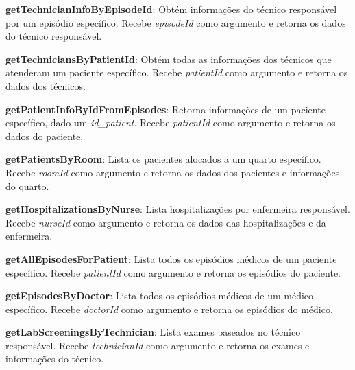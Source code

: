 \vspace{0.15cm}

\textbf{getTechnicianInfoByEpisodeId}: Obtém informações do técnico responsável por um episódio específico. Recebe \textit{episodeId} como argumento e retorna os dados do técnico responsável.

\vspace{0.15cm}

\textbf{getTechniciansByPatientId}: Obtém todas as informações dos técnicos que atenderam um paciente específico. Recebe \textit{patientId} como argumento e retorna os dados dos técnicos.

\vspace{0.15cm}

\textbf{getPatientInfoByIdFromEpisodes}: Retorna informações de um paciente específico, dado um \textit{id\_patient}. Recebe \textit{patientId} como argumento e retorna os dados do paciente.

\vspace{0.15cm}

\textbf{getPatientsByRoom}: Lista os pacientes alocados a um quarto específico. Recebe \textit{roomId} como argumento e retorna os dados dos pacientes e informações do quarto.

\vspace{0.15cm}

\textbf{getHospitalizationsByNurse}: Lista hospitalizações por enfermeira responsável. Recebe \textit{nurseId} como argumento e retorna os dados das hospitalizações e da enfermeira.

\vspace{0.15cm}

\textbf{getAllEpisodesForPatient}: Lista todos os episódios médicos de um paciente específico. Recebe \textit{patientId} como argumento e retorna os episódios do paciente.

\vspace{0.15cm}

\textbf{getEpisodesByDoctor}: Lista todos os episódios médicos de um médico específico. Recebe \textit{doctorId} como argumento e retorna os episódios do médico.

\vspace{0.15cm}

\textbf{getLabScreeningsByTechnician}: Lista exames baseados no técnico responsável. Recebe \textit{technicianId} como argumento e retorna os exames e informações do técnico.

\vspace{0.15cm}

